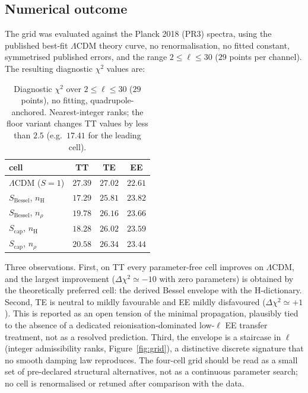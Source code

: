 \documentclass[11pt]{article}
\newcommand{\lcdm}{\Lambda\mathrm{CDM}}
\begin{document}
\subsection{Numerical outcome}
\label{subsec:outcome}

The grid was evaluated against the Planck 2018 (PR3) spectra, using the published best-fit $\lcdm$
theory curve, no renormalisation, no fitted constant, symmetrised published errors, and the range
$2\le\ell\le30$ ($29$ points per channel).
The resulting diagnostic $\chi^2$ values are:

\begin{table}[h]
\centering
\begin{tabular}{lccc}
\toprule
cell & TT & TE & EE \\
\midrule
$\lcdm$ ($S=1$)                        & $27.39$ & $27.02$ & $22.61$ \\
$S_{\mathrm{Bessel}}$, $n_{\mathrm{H}}$    & $\mathbf{17.29}$ & $25.81$ & $23.82$ \\
$S_{\mathrm{Bessel}}$, $n_{\rho}$          & $19.78$ & $26.16$ & $23.66$ \\
$S_{\mathrm{cap}}$, $n_{\mathrm{H}}$       & $18.28$ & $26.02$ & $23.59$ \\
$S_{\mathrm{cap}}$, $n_{\rho}$             & $20.58$ & $26.34$ & $23.44$ \\
\bottomrule
\end{tabular}
\caption{Diagnostic $\chi^2$ over $2\le\ell\le30$ ($29$ points), no fitting, quadrupole-anchored.
Nearest-integer ranks; the floor variant changes TT values by less than $2.5$ (e.g.\ $17.41$ for
the leading cell).}
\label{tab:grid}
\end{table}

Three observations.
First, on TT every parameter-free cell improves on $\lcdm$, and the largest improvement
($\Delta\chi^2\simeq-10$ with zero parameters) is obtained by the theoretically preferred cell:
the derived Bessel envelope with the H-dictionary.
Second, TE is neutral to mildly favourable and EE mildly disfavoured ($\Delta\chi^2\simeq+1$).
This is reported as an open tension of the minimal propagation, plausibly tied to the absence of a
dedicated reionisation-dominated low-$\ell$ EE transfer treatment, not as a resolved prediction.
Third, the envelope is a staircase in $\ell$ (integer admissibility ranks,
Figure~\ref{fig:grid}), a distinctive discrete signature that no smooth damping law reproduces.
The four-cell grid should be read as a small set of pre-declared structural alternatives, not as a
continuous parameter search; no cell is renormalised or retuned after comparison with the data.
\end{document}
